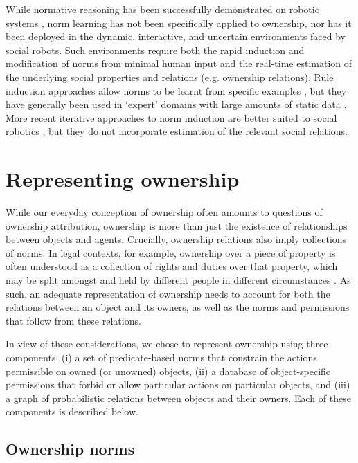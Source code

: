 \documentclass[letterpaper]{article} %
\begin{document}
While normative reasoning has been successfully demonstrated on robotic systems \cite{galindo2012semantic,sarathy2016logic}, norm learning has not been specifically applied to ownership, nor has it been deployed in the dynamic, interactive, and uncertain environments faced by social robots. Such environments require both the rapid induction and modification of norms from minimal human input and the real-time estimation of the underlying social properties and relations (e.g. ownership relations). Rule induction approaches allow norms to be learnt from specific examples \cite{furnkranz1999separate,ruckert2008statistical}, but they have generally been used in `expert' domains with large amounts of static data \cite{langley1995applications,maloof2003incremental}. More recent iterative approaches to norm induction are better suited to social robotics \cite{corapi2011normative}, but they do not incorporate estimation of the relevant social relations.

\section{Representing ownership}

While our everyday conception of ownership often amounts to questions of ownership attribution, ownership is more than just the existence of relationships between objects and agents. Crucially, ownership relations also imply collections of norms. In legal contexts, for example, ownership over a piece of property is often understood as a collection of rights and duties over that property, which may be split amongst and held by different people in different circumstances \cite{mccarty2002ownership}. As such, an adequate representation of ownership needs to account for both the relations between an object and its owners, as well as the norms and permissions that follow from these relations.

In view of these considerations, we chose to represent ownership using three components: (i) a set of predicate-based norms that constrain the actions permissible on owned (or unowned) objects, (ii) a database of object-specific permissions that forbid or allow particular actions on particular objects, and (iii) a graph of probabilistic relations between objects and their owners. Each of these components is described below.

\subsection{Ownership norms}
\end{document}
